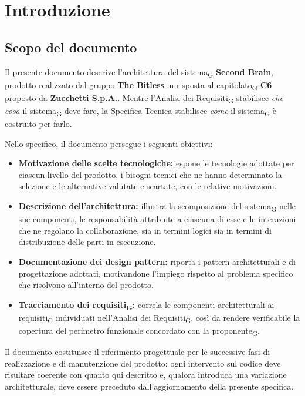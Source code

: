 \documentclass[a4paper, 10pt]{article}
\begin{document}
\section{Introduzione}
\label{sec:introduzione}

\subsection{Scopo del documento}
\label{sec:scopo-documento}
Il presente documento descrive l'architettura del sistema\textsubscript{G} \textbf{Second Brain}, prodotto realizzato dal gruppo \textbf{The Bitless} in risposta al capitolato\textsubscript{G} \textbf{C6} proposto da \textbf{Zucchetti S.p.A.}. Mentre l'Analisi dei Requisiti\textsubscript{G} stabilisce \textit{che cosa} il sistema\textsubscript{G} deve fare, la Specifica Tecnica stabilisce \textit{come} il sistema\textsubscript{G} è costruito per farlo.

Nello specifico, il documento persegue i seguenti obiettivi:

\begin{itemize}
    \item \textbf{Motivazione delle scelte tecnologiche:} espone le tecnologie adottate per ciascun livello del prodotto, i bisogni tecnici che ne hanno determinato la selezione e le alternative valutate e scartate, con le relative motivazioni.

    \item \textbf{Descrizione dell'architettura:} illustra la scomposizione del sistema\textsubscript{G} nelle sue componenti, le responsabilità attribuite a ciascuna di esse e le interazioni che ne regolano la collaborazione, sia in termini logici sia in termini di distribuzione delle parti in esecuzione.

    \item \textbf{Documentazione dei design pattern:} riporta i pattern architetturali e di progettazione adottati, motivandone l'impiego rispetto al problema specifico che risolvono all'interno del prodotto.

    \item \textbf{Tracciamento dei requisiti\textsubscript{G}:} correla le componenti architetturali ai requisiti\textsubscript{G} individuati nell'Analisi dei Requisiti\textsubscript{G}, così da rendere verificabile la copertura del perimetro funzionale concordato con la proponente\textsubscript{G}.
\end{itemize}

Il documento costituisce il riferimento progettuale per le successive fasi di realizzazione e di manutenzione del prodotto: ogni intervento sul codice deve risultare coerente con quanto qui descritto e, qualora introduca una variazione architetturale, deve essere preceduto dall'aggiornamento della presente specifica.
\end{document}
